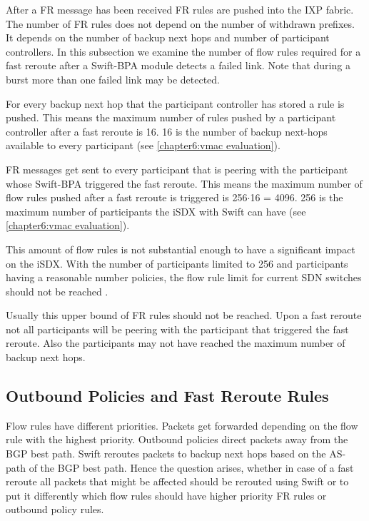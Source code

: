After a FR message has been received FR rules are pushed into the IXP fabric. The number of FR rules does not depend on the number of withdrawn prefixes. It depends on the number of backup next hops and number of participant controllers. 
In this subsection we examine the number of flow rules required for a fast reroute after a Swift-BPA module detects a failed link. Note that during a burst more than one failed link may be detected. 

For every backup next hop that the participant controller has stored a rule is pushed. This means the maximum number of rules pushed by a participant controller after a fast reroute is 16. 16 is the number of backup next-hops available to every participant (see \ref{chapter6:vmac evaluation}).

FR messages get sent to every participant that is peering with the participant whose Swift-BPA triggered the fast reroute. This means the maximum number of flow rules pushed after a fast reroute is triggered is 256$\cdot$16 = 4096. 256 is the maximum number of participants the iSDX with Swift can have (see \ref{chapter6:vmac evaluation}).

This amount of flow rules is not substantial enough to have a significant impact on the iSDX. With the number of participants limited to 256 and participants having a reasonable number policies, the flow rule limit for current SDN switches should not be reached \cite[Figure 3 (a)]{gupta2016industrial}.

Usually this upper bound of FR rules should not be reached. Upon a fast reroute not all participants will be peering with the participant that triggered the fast reroute. Also the participants may not have reached the maximum number of backup next hops.

\subsection{\label{chapter6:number of flow rules:outbound_FR}Outbound Policies and Fast Reroute Rules}

Flow rules have different priorities. Packets get forwarded depending on the flow rule with the highest priority. 
Outbound policies direct packets away from the BGP best path. Swift reroutes packets to backup next hops based on the AS-path of the BGP best path. Hence the question arises, whether in case of a fast reroute all packets that might be affected should be rerouted using Swift or to put it differently which flow rules should have higher priority FR rules or outbound policy rules.

